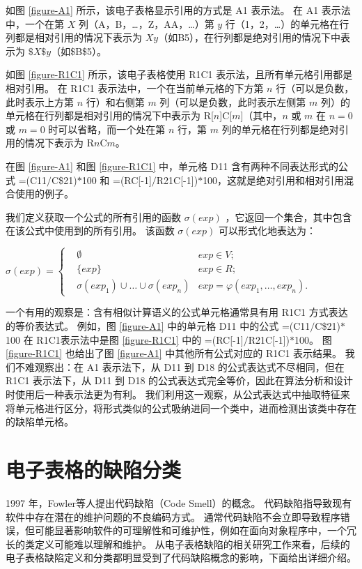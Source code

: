 如图 \ref{figure-A1} 所示，该电子表格显示引用的方式是 A1 表示法。
在 A1 表示法中，一个在第 $X$ 列（A，B，\dots，Z，AA，\dots）第 $y$ 行（1，2，\dots）的单元格在行列都是相对引用的情况下表示为 $Xy$（如B5），在行列都是绝对引用的情况下中表示为 $\$X\$y$（如\$B\$5）。



如图 \ref{figure-R1C1} 所示，该电子表格使用 R1C1 表示法，且所有单元格引用都是相对引用。
在 R1C1 表示法中，一个在当前单元格的下方第 $n$ 行（可以是负数，此时表示上方第 $n$ 行）和右侧第 $m$ 列（可以是负数，此时表示左侧第 $m$ 列）的单元格在行列都是相对引用的情况下中表示为 R[$n$]C[$m$]（其中，$n$ 或 $m$ 在 $n=0$ 或 $m=0$ 时可以省略，而一个处在第 $n$ 行，第 $m$ 列的单元格在行列都是绝对引用的情况下表示为 R$n$C$m$。

在图 \ref{figure-A1} 和图 \ref{figure-R1C1} 中，单元格 D11 含有两种不同表达形式的公式 =(C11$/$C\$21)$*$100 和 =(RC[-1]$/$R21C[-1])$*$100，这就是绝对引用和相对引用混合使用的例子。

我们定义获取一个公式的所有引用的函数 $\sigma(exp)$ ，它返回一个集合，其中包含在该公式中使用到的所有引用。
该函数 $\sigma(exp)$ 可以形式化地表达为：
\begin{definition}
$
\sigma(exp) = 
\left\{
    \begin{aligned}
       & \emptyset & exp \in V; \\
       & \{exp\}     & exp \in R; \\
       & \sigma(exp_1) \cup \dots \cup \sigma(exp_n) & exp = \varphi(exp_1, \dots , exp_n).
    \end{aligned}
\right.
$
\end{definition}

一个有用的观察是：含有相似计算语义的公式单元格通常具有用 R1C1 方式表达的等价表达式。
例如，图 \ref{figure-A1} 中的单元格 D11 中的公式 =(C11$/$C\$21)$*$100 在 R1C1表示法中是图 \ref{figure-R1C1} 中的 =(RC[-1]$/$R21C[-1])$*$100。
图 \ref{figure-R1C1} 也给出了图 \ref{figure-A1} 中其他所有公式对应的 R1C1 表示结果。
我们不难观察出：在 A1 表示法下，从 D11 到 D18 的公式表达式不尽相同，但在 R1C1 表示法下，从 D11 到 D18 的公式表达式完全等价，因此在算法分析和设计时使用后一种表示法更为有利。
我们利用这一观察，从公式表达式中抽取特征来将单元格进行区分，将形式类似的公式吸纳进同一个类中，进而检测出该类中存在的缺陷单元格。


\section{电子表格的缺陷分类}
1997 年，Fowler等人\cite{fowler1997refactoring}提出代码缺陷（Code Smell）的概念。
代码缺陷指导致现有软件中存在潜在的维护问题的不良编码方式。
通常代码缺陷不会立即导致程序错误，但可能显著影响软件的可理解性和可维护性，例如在面向对象程序中，一个冗长的类定义可能难以理解和维护。
从电子表格缺陷的相关研究工作来看，后续的电子表格缺陷定义和分类都明显受到了代码缺陷概念的影响，下面给出详细介绍。

